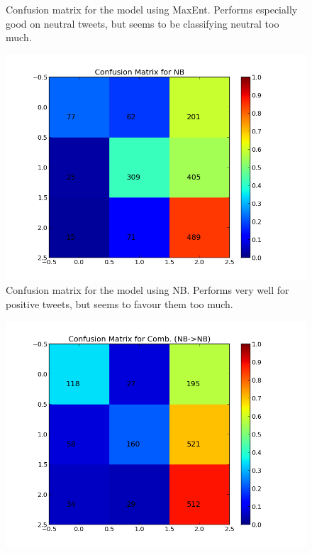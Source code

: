 \begin{minipage}[t!]{\linewidth}
\begin{minipage}{0.45\linewidth}
\begin{figure}[H]
           \caption[The confusion matrix for MaxEnt]{Confusion matrix for the model using MaxEnt. Performs especially good on neutral tweets, but seems to be classifying neutral too much.}
           \label{fig:confmat_maxent}
          \end{figure}
     \end{minipage}
     \begin{minipage}{0.45\linewidth}
          \begin{figure}[H]
               \includegraphics[width=\linewidth]{../img/plots/grid/confusion_matrix_NB.png}
           \caption[The confusion matrix for NB]{Confusion matrix for the model using NB. Performs very well for positive tweets, but seems to favour them too much.}
           \label{fig:confmat_nb}
          \end{figure}
     \end{minipage}
     \hspace{0.05\linewidth}
     \begin{minipage}{0.45\linewidth}
          \begin{figure}[H]
               \includegraphics[width=\linewidth]{../img/plots/grid/confusion_matrix_Comb-NB-NB.png}

\end{figure}
\end{minipage}
\end{minipage}

